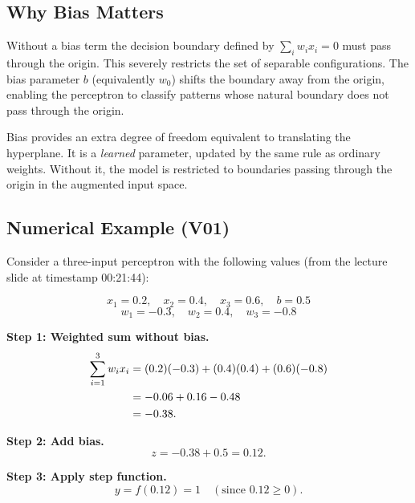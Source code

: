 \documentclass[12pt,a4paper]{article}
\begin{document}
\subsection{Why Bias Matters}
\label{subsec:why-bias}

Without a bias term the decision boundary defined by
$\sum_i w_i x_i = 0$ must pass through the origin.  This severely
restricts the set of separable configurations.  The bias parameter $b$
(equivalently $w_0$) shifts the boundary away from the origin, enabling
the perceptron to classify patterns whose natural boundary does not
pass through the origin.

\begin{keyinsight}[title=Key Insight -- Bias Shifts the Decision Boundary]
Bias provides an extra degree of freedom equivalent to translating the
hyperplane.  It is a \emph{learned} parameter, updated by the same rule
as ordinary weights.  Without it, the model is restricted to boundaries
passing through the origin in the augmented input space.
\end{keyinsight}

\subsection{Numerical Example (V01)}
\label{subsec:bias-example}

Consider a three-input perceptron with the following values (from the
lecture slide at timestamp 00:21:44):

\[
  x_1 = 0.2,\quad x_2 = 0.4,\quad x_3 = 0.6,\quad b = 0.5
\]
\[
  w_1 = -0.3,\quad w_2 = 0.4,\quad w_3 = -0.8
\]

\textbf{Step 1: Weighted sum without bias.}
\begin{align}
  \label{eq:weighted-sum}
  \sum_{i=1}^{3} w_i x_i
    &= (0.2)(-0.3) + (0.4)(0.4) + (0.6)(-0.8) \notag \\
    &= -0.06 + 0.16 - 0.48 \notag \\
    &= -0.38.
\end{align}

\textbf{Step 2: Add bias.}
\begin{equation}
  \label{eq:add-bias}
  z = -0.38 + 0.5 = 0.12.
\end{equation}

\textbf{Step 3: Apply step function.}
\begin{equation}
  \label{eq:apply-step}
  y = f(0.12) = 1 \quad (\text{since } 0.12 \geq 0).
\end{equation}
\end{document}
